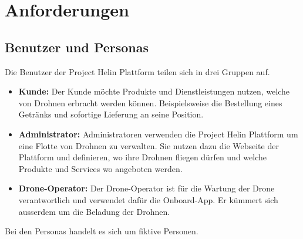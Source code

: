 \chapter{Anforderungen}
\section{Benutzer und Personas}
Die Benutzer der Project Helin Plattform teilen sich in drei Gruppen auf.
\begin{itemize}
	\item{\textbf{Kunde:} Der Kunde möchte Produkte und Dienstleistungen nutzen, welche von Drohnen erbracht werden können. Beispielsweise die Bestellung eines Getränks und sofortige Lieferung an seine Position.}
	\item{\textbf{Administrator:} Administratoren verwenden die Project Helin Plattform um eine Flotte von Drohnen zu verwalten. Sie nutzen dazu die Webseite der Plattform und definieren, wo ihre Drohnen fliegen dürfen und welche Produkte und Services wo angeboten werden.}
	\item{\textbf{Drone-Operator:} Der Drone-Operator ist für die Wartung der Drone verantwortlich und verwendet dafür die Onboard-App. Er kümmert sich ausserdem um die Beladung der Drohnen.}
\end{itemize}

Bei den Personas handelt es sich um fiktive Personen.
